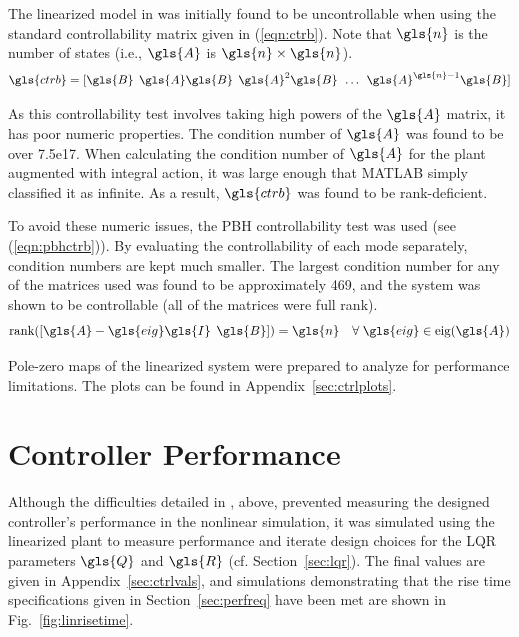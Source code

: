 \documentclass{sydeStyle}
\begin{document}
The linearized model in \cite{spottiswoode} was initially found to be
uncontrollable when using the standard controllability matrix given in
(\ref{eqn:ctrb}).  Note that $\gls{n}$ is the number of states (i.e., $\gls{A}$
is $\gls{n} \times \gls{n}$).
\begin{equation}
    \gls{ctrb} = [\gls{B} \;\, \gls{A}\gls{B} \;\, \gls{A}^2\gls{B} \;\, \ldots
    \;\, \gls{A}^{\gls{n}-1}\gls{B}]
    \label{eqn:ctrb}
\end{equation}

As this controllability test involves taking high powers of the $\gls{A}$
matrix, it has poor numeric properties.  The condition number of $\gls{A}$ was
found to be over 7.5e17.  When calculating the condition number of $\gls{A}$ for
the plant augmented with integral action, it was large enough that MATLAB simply
classified it as infinite.  As a result, $\gls{ctrb}$ was found to be
rank-deficient.


To avoid these numeric issues, the PBH controllability test was used (see
(\ref{eqn:pbhctrb})).  By evaluating the controllability of each mode separately,
condition numbers are kept much smaller.  The largest condition number for any
of the matrices used was found to be approximately 469, and the system was shown
to be controllable (all of the matrices were full rank).
\begin{equation}
    \textrm{rank}([\gls{A} - \gls{eig} \gls{I} \;\, \gls{B}]) = \gls{n} \quad
    \forall \; \gls{eig} \in \textrm{eig}(\gls{A})
    \label{eqn:pbhctrb}
\end{equation}

Pole-zero maps of the linearized system were prepared to analyze for performance
limitations.  The plots can be found in Appendix~\ref{sec:ctrlplots}.

\section{Controller Performance}
Although the difficulties detailed in , above, prevented
measuring the designed controller's performance in the nonlinear simulation, it
was simulated using the linearized plant to measure performance and iterate
design choices for the LQR parameters $\gls{Q}$ and $\gls{R}$ (cf.
Section~\ref{sec:lqr}).  The final values are given in
Appendix~\ref{sec:ctrlvals}, and simulations demonstrating that the rise time
specifications given in Section~\ref{sec:perfreq} have been met are shown in
Fig.~\ref{fig:linrisetime}.
\end{document}
